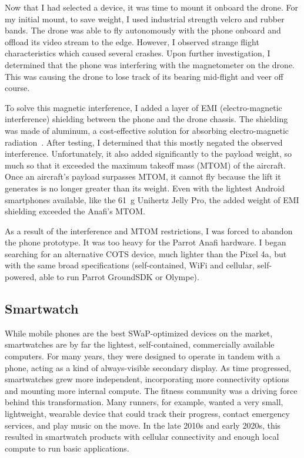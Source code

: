 Now that I had selected a device, it was time to mount it onboard the drone. For my initial mount, to save weight, I used industrial strength velcro and rubber bands. The drone was able to fly autonomously with the phone onboard and offload its video stream to the edge. However, I observed strange flight characteristics which caused several crashes. Upon further investigation, I determined that the phone was interfering with the magnetometer on the drone. This was causing the drone to lose track of its bearing mid-flight and veer off course.

To solve this magnetic interference, I added a layer of EMI  (electro-magnetic interference) shielding between the phone and the drone chassis. The shielding was made of aluminum, a cost-effective solution for absorbing electro-magnetic radiation~\cite{Orasugh2023}. After testing, I determined that this mostly negated the observed interference. Unfortunately, it also added significantly to the payload weight, so much so that it exceeded the maximum takeoff mass (MTOM) of the aircraft. Once an aircraft's payload surpasses MTOM, it cannot fly because the lift it generates is no longer greater than its weight. Even with the lightest Android smartphones available, like the 61~g Unihertz Jelly Pro, the added weight of EMI shielding exceeded the Anafi's MTOM. 

As a result of the interference and MTOM restrictions, I was forced to abandon the phone prototype. It was too heavy for the Parrot Anafi hardware. I began searching for an alternative COTS device, much lighter than the Pixel 4a, but with the same broad specifications (self-contained, WiFi and cellular, self-powered, able to run Parrot GroundSDK or Olympe). 

\subsection{Smartwatch}
While mobile phones are the best SWaP-optimized devices on the market, smartwatches are by far the lightest, self-contained, commercially available computers. For many years, they were designed to operate in tandem with a phone, acting as a kind of always-visible secondary display. As time progressed, smartwatches grew more independent, incorporating more connectivity options and mounting more internal compute. The fitness community was a driving force behind this transformation. Many runners, for example, wanted a very small, lightweight, wearable device that could track their progress, contact emergency services, and play music on the move. In the late 2010s and early 2020s, this resulted in smartwatch products with cellular connectivity and enough local compute to run basic applications.

